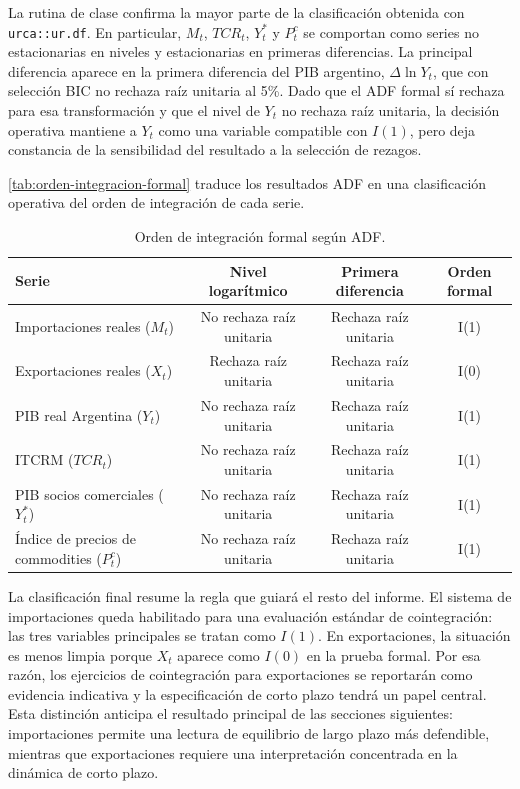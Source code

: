\documentclass[11pt,a4paper]{article}
\begin{document}
	La rutina de clase confirma la mayor parte de la clasificación obtenida con
	\texttt{urca::ur.df}. En particular, \(M_t\), \(TCR_t\), \(Y_t^*\) y \(P_t^c\)
	se comportan como series no estacionarias en niveles y estacionarias en
	primeras diferencias. La principal diferencia aparece en la primera diferencia
	del PIB argentino, \(\Delta \ln Y_t\), que con selección BIC no rechaza raíz
	unitaria al 5\%. Dado que el ADF formal sí rechaza para esa transformación y
	que el nivel de \(Y_t\) no rechaza raíz unitaria, la decisión operativa mantiene
	a \(Y_t\) como una variable compatible con \(I(1)\), pero deja constancia de la
	sensibilidad del resultado a la selección de rezagos.
	
	\autoref{tab:orden-integracion-formal} traduce los resultados ADF en una
	clasificación operativa del orden de integración de cada serie.
	
	\begin{table}[H]
		\centering
		\caption{Orden de integración formal según ADF.}
		\label{tab:orden-integracion-formal}
		\small
		\begin{tabular}{lccc}
			\toprule
			Serie & Nivel logarítmico & Primera diferencia & Orden formal \\
			\midrule
			Importaciones reales (\(M_t\)) & No rechaza raíz unitaria & Rechaza raíz unitaria & I(1) \\
			Exportaciones reales (\(X_t\)) & Rechaza raíz unitaria & Rechaza raíz unitaria & I(0) \\
			PIB real Argentina (\(Y_t\)) & No rechaza raíz unitaria & Rechaza raíz unitaria & I(1) \\
			ITCRM (\(TCR_t\)) & No rechaza raíz unitaria & Rechaza raíz unitaria & I(1) \\
			PIB socios comerciales (\(Y_t^*\)) & No rechaza raíz unitaria & Rechaza raíz unitaria & I(1) \\
			Índice de precios de commodities (\(P_t^c\)) & No rechaza raíz unitaria & Rechaza raíz unitaria & I(1) \\
			\bottomrule
		\end{tabular}
	\end{table}
	
	La clasificación final resume la regla que guiará el resto del informe. El
	sistema de importaciones queda habilitado para una evaluación estándar de
	cointegración: las tres variables principales se tratan como \(I(1)\). En
	exportaciones, la situación es menos limpia porque \(X_t\) aparece como \(I(0)\)
	en la prueba formal. Por esa razón, los ejercicios de cointegración para
	exportaciones se reportarán como evidencia indicativa y la especificación de
	corto plazo tendrá un papel central. Esta distinción anticipa el resultado
	principal de las secciones siguientes: importaciones permite una lectura de
	equilibrio de largo plazo más defendible, mientras que exportaciones requiere
	una interpretación concentrada en la dinámica de corto plazo.
	
\end{document}
